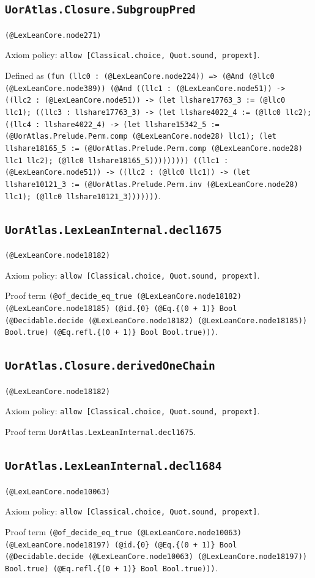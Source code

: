 \documentclass[11pt]{article}
\begin{document}
\subsection*{\texttt{UorAtlas.Closure.SubgroupPred}}
\noindent\texttt{(@LexLeanCore.node271)}\par
\noindent Axiom policy: \texttt{allow [Classical.choice, Quot.sound, propext]}.\par
\noindent Defined as \texttt{(fun (llc0 : (@LexLeanCore.node224)) => (@And (@llc0 (@LexLeanCore.node389)) (@And ((llc1 : (@LexLeanCore.node51)) -> ((llc2 : (@LexLeanCore.node51)) -> (let llshare17763\_3 := (@llc0 llc1); ((llc3 : llshare17763\_3) -> (let llshare4022\_4 := (@llc0 llc2); ((llc4 : llshare4022\_4) -> (let llshare15342\_5 := (@UorAtlas.Prelude.Perm.comp (@LexLeanCore.node28) llc1); (let llshare18165\_5 := (@UorAtlas.Prelude.Perm.comp (@LexLeanCore.node28) llc1 llc2); (@llc0 llshare18165\_5))))))))) ((llc1 : (@LexLeanCore.node51)) -> ((llc2 : (@llc0 llc1)) -> (let llshare10121\_3 := (@UorAtlas.Prelude.Perm.inv (@LexLeanCore.node28) llc1); (@llc0 llshare10121\_3)))))))}.\par
\subsection*{\texttt{UorAtlas.LexLeanInternal.decl1675}}
\noindent\texttt{(@LexLeanCore.node18182)}\par
\noindent Axiom policy: \texttt{allow [Classical.choice, Quot.sound, propext]}.\par
\noindent Proof term \texttt{(@of\_decide\_eq\_true (@LexLeanCore.node18182) (@LexLeanCore.node18185) (@id.\{0\} (@Eq.\{(0 + 1)\} Bool (@Decidable.decide (@LexLeanCore.node18182) (@LexLeanCore.node18185)) Bool.true) (@Eq.refl.\{(0 + 1)\} Bool Bool.true)))}.\par
\subsection*{\texttt{UorAtlas.Closure.derivedOneChain}}
\noindent\texttt{(@LexLeanCore.node18182)}\par
\noindent Axiom policy: \texttt{allow [Classical.choice, Quot.sound, propext]}.\par
\noindent Proof term \texttt{UorAtlas.LexLeanInternal.decl1675}.\par
\subsection*{\texttt{UorAtlas.LexLeanInternal.decl1684}}
\noindent\texttt{(@LexLeanCore.node10063)}\par
\noindent Axiom policy: \texttt{allow [Classical.choice, Quot.sound, propext]}.\par
\noindent Proof term \texttt{(@of\_decide\_eq\_true (@LexLeanCore.node10063) (@LexLeanCore.node18197) (@id.\{0\} (@Eq.\{(0 + 1)\} Bool (@Decidable.decide (@LexLeanCore.node10063) (@LexLeanCore.node18197)) Bool.true) (@Eq.refl.\{(0 + 1)\} Bool Bool.true)))}.\par
\end{document}

